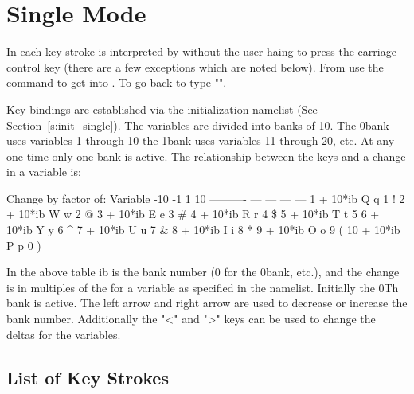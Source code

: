 \chapter{Single Mode}
\label{c:single}

In  each key stroke is interpreted by \tao without the user haing to press 
the carriage control key (there are a few exceptions which are noted below). From 
use the  command to get into . To go back to  type
"".

Key bindings are established via the  initialization namelist 
(See Section~\ref{s:init_single}). 
The variables are divided into banks of 10. The 0\Th bank uses variables 1
through 10 the 1\St bank uses variables 11 through 20, etc. 
At any one time only one bank is active. The relationship between
the keys and a change in a variable is:
\begin{example}
                 Change by factor of:          
     Variable    -10  -1    1   10
   ----------    ---  ---  ---  ---
    1 + 10*ib     Q    q    1    !   
    2 + 10*ib     W    w    2    @    
    3 + 10*ib     E    e    3    \#   
    4 + 10*ib     R    r    4    \$   
    5 + 10*ib     T    t    5    %
    6 + 10*ib     Y    y    6    ^   
    7 + 10*ib     U    u    7    \&
    8 + 10*ib     I    i    8    *   
    9 + 10*ib     O    o    9    (   
   10 + 10*ib     P    p    0    )   
\end{example}
In the above table ib is the bank number (0 for the 0\Th bank, etc.), 
and the change is in
multiples of the  for a variable as specified in the 
namelist. Initially the 0Th bank is active. The
left arrow and right arrow are used to decrease or increase the bank number. 
Additionally the "<" and ">" keys can be used to change the deltas for the variables. 

\section{List of Key Strokes}
\label{s:keys}

